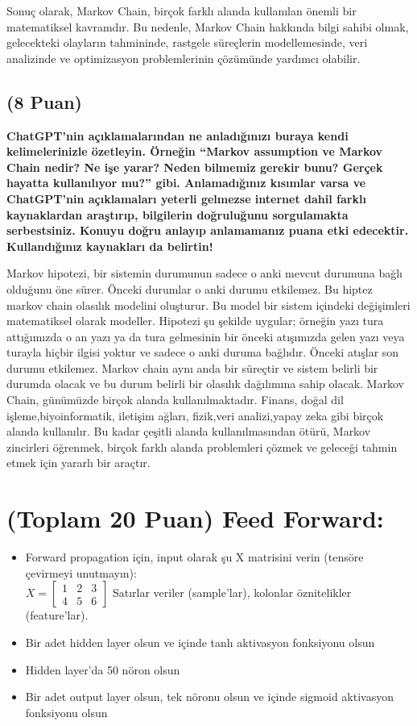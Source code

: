 \documentclass[11pt]{article}
\begin{document}
Sonuç olarak, Markov Chain, birçok farklı alanda kullanılan önemli bir matematiksel kavramdır. Bu nedenle, Markov Chain hakkında bilgi sahibi olmak, gelecekteki olayların tahmininde, rastgele süreçlerin modellemesinde, veri analizinde ve optimizasyon problemlerinin çözümünde yardımcı olabilir.


\subsection{(8 Puan)} \textbf{ChatGPT’nin açıklamalarından ne anladığınızı buraya kendi kelimelerinizle özetleyin. Örneğin ``Markov assumption ve Markov Chain nedir? Ne işe yarar? Neden bilmemiz gerekir bunu? Gerçek hayatta kullanılıyor mu?'' gibi. Anlamadığınız kısımlar varsa ve ChatGPT’nin açıklamaları yeterli gelmezse internet dahil farklı kaynaklardan araştırıp, bilgilerin doğruluğunu sorgulamakta serbestsiniz. Konuyu doğru anlayıp anlamamanız puana etki edecektir. Kullandığınız kaynakları da belirtin!}

 Markov hipotezi, bir sistemin durumunun sadece o anki mevcut durumuna bağlı olduğunu öne sürer. Önceki durumlar o anki durumu etkilemez. Bu hiptez markov chain olasılık modelini oluşturur. Bu model bir sistem içindeki değişimleri matematiksel olarak modeller. Hipotezi şu şekilde uygular; örneğin yazı tura attığımızda o an yazı ya da tura gelmesinin bir önceki atışımızda gelen yazı veya turayla hiçbir ilgisi yoktur ve sadece o anki duruma bağlıdır. Önceki atışlar son durumu etkilemez. Markov chain aynı anda bir süreçtir ve sistem belirli bir durumda olacak ve bu durum belirli bir olasılık dağılımına sahip olacak. Markov Chain, günümüzde birçok alanda kullanılmaktadır. Finans, doğal dil işleme,biyoinformatik, iletişim ağları, fizik,veri analizi,yapay zeka gibi birçok alanda kullanılır. Bu kadar çeşitli alanda kullanılmasından ötürü, Markov zincirleri öğrenmek, birçok farklı alanda problemleri çözmek ve geleceği tahmin etmek için yararlı bir araçtır.
 
\section{(Toplam 20 Puan) Feed Forward:}
 
\begin{itemize}
    \item Forward propagation için, input olarak şu X matrisini verin (tensöre çevirmeyi unutmayın):\\
    $X = \begin{bmatrix}
        1 & 2 & 3\\
        4 & 5 & 6
        \end{bmatrix}$
    Satırlar veriler (sample'lar), kolonlar öznitelikler (feature'lar).
    \item Bir adet hidden layer olsun ve içinde tanh aktivasyon fonksiyonu olsun
    \item Hidden layer'da 50 nöron olsun
    \item Bir adet output layer olsun, tek nöronu olsun ve içinde sigmoid aktivasyon fonksiyonu olsun
\end{itemize}
\end{document}
